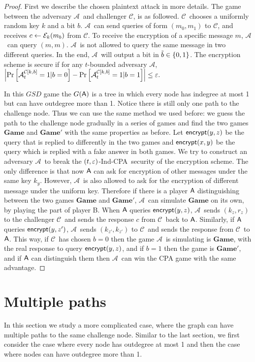 \documentclass{article}
\newcommand{\tcpa}{$(t,\eps)$-Ind-CPA}
\def\B{{\sf B}}
\def\A{{\sf A}}
\def\E{{\cal E}}
\def\a {${\mathcal A}$}
\def\ch {${\mathcal C}$}
\newcommand{\encrypt}{{\sf encrypt}}
\newcommand{\dgame}{{\mathbf{Game}}}
\begin{document}
\begin{proof}
First we describe the chosen plaintext attack in more details. The game between the adversary \a~and challenger \ch, is as followed. \ch~chooses a uniformly random key $k$ and a bit $b$. \a~can send queries of form $(m_0,m_1)$ to \ch, and receives $c\leftarrow \E_k(m_b)$ from \ch. To receive the encryption of a specific message $m$, \a~can query $(m,m)$. \a~is not allowed to query the same message in two different queries. In the end, \a~will output a bit in $\tilde{b}\in \{0,1\}$. The encryption scheme is secure if for any $t$-bounded adversary \a, $\left| \Pr \left[ \mathcal{A}_t^{\mathcal{C}[k,b]}=1|b=0 \right] - \Pr \left[ \mathcal{A}_t^{\mathcal{C}[k,b]}=1|b=1 \right]  \right|\leq \varepsilon.$

 In this $GSD$ game the $G(\A)$ is a tree in which every node has indegree at most 1 but can have outdegree more than 1. Notice there is still only one path to the challenge node. Thus we can use the same method we used before: we guess the path to the challenge node gradually in a series of games and find the two games $\dgame$ and $\dgame'$ with the same properties as before. Let $\encrypt(y,z)$ be the query that is replied to differently in the two games and $\encrypt(x,y)$ be the query which is replied with a fake answer in both games. We try to construct an adversary \a~to break the \tcpa~security of the encryption scheme. The only difference is that now $\A$ can ask for encryption of other messages under the same key $k_y$. However, \a~is also allowed to ask for the encryption of different message under the uniform key. Therefore if there is a player $\A$ distinguishing between the two games $\dgame$ and $\dgame'$, \a~can simulate $\dgame$ on its own, by playing the part of player \B. When $\A$ queries $\encrypt(y,z)$, \a~sends $(k_z,r_z)$ to the challenger \ch~and sends the response $c$ from \ch~back to $\A$. Similarly, if $\A$ queries $\encrypt(y,z')$, \a~sends $(k_{z'},k_{z'})$ to \ch~and sends the response from \ch~to $\A$. This way, if \ch~has chosen $b=0$ then the game \a~is simulating is $\dgame$, with the real response to query $\encrypt(y,z)$, and if $b=1$ then the game is $\dgame'$, and if $\A$ can distinguish them then \a~can win the CPA game with the same advantage.
\end{proof}

\section{Multiple paths}

In this section we study a more complicated case, where the graph can have multiple paths to the same challenge node. Similar to the last section, we first consider the case where every node has outdegree at most 1 and then the case where nodes can have outdegree more than 1.
\end{document}
